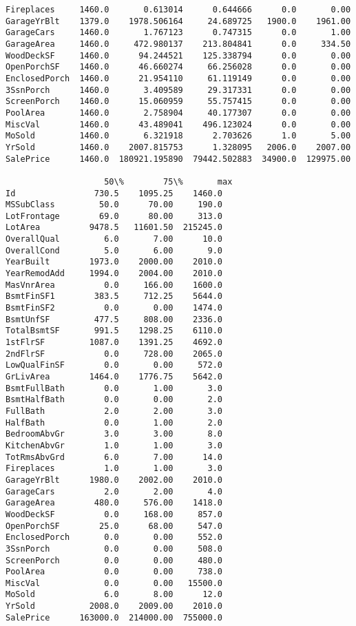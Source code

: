 \documentclass[12pt,a4paper,table]{article}
\begin{document}
\begin{tcolorbox}[breakable, size=fbox, boxrule=.5pt, pad at break*=1mm, opacityfill=0]
\begin{Verbatim}[commandchars=\\\{\}]
Fireplaces     1460.0       0.613014      0.644666      0.0       0.00
GarageYrBlt    1379.0    1978.506164     24.689725   1900.0    1961.00
GarageCars     1460.0       1.767123      0.747315      0.0       1.00
GarageArea     1460.0     472.980137    213.804841      0.0     334.50
WoodDeckSF     1460.0      94.244521    125.338794      0.0       0.00
OpenPorchSF    1460.0      46.660274     66.256028      0.0       0.00
EnclosedPorch  1460.0      21.954110     61.119149      0.0       0.00
3SsnPorch      1460.0       3.409589     29.317331      0.0       0.00
ScreenPorch    1460.0      15.060959     55.757415      0.0       0.00
PoolArea       1460.0       2.758904     40.177307      0.0       0.00
MiscVal        1460.0      43.489041    496.123024      0.0       0.00
MoSold         1460.0       6.321918      2.703626      1.0       5.00
YrSold         1460.0    2007.815753      1.328095   2006.0    2007.00
SalePrice      1460.0  180921.195890  79442.502883  34900.0  129975.00

                    50\%        75\%       max
Id                730.5    1095.25    1460.0
MSSubClass         50.0      70.00     190.0
LotFrontage        69.0      80.00     313.0
LotArea          9478.5   11601.50  215245.0
OverallQual         6.0       7.00      10.0
OverallCond         5.0       6.00       9.0
YearBuilt        1973.0    2000.00    2010.0
YearRemodAdd     1994.0    2004.00    2010.0
MasVnrArea          0.0     166.00    1600.0
BsmtFinSF1        383.5     712.25    5644.0
BsmtFinSF2          0.0       0.00    1474.0
BsmtUnfSF         477.5     808.00    2336.0
TotalBsmtSF       991.5    1298.25    6110.0
1stFlrSF         1087.0    1391.25    4692.0
2ndFlrSF            0.0     728.00    2065.0
LowQualFinSF        0.0       0.00     572.0
GrLivArea        1464.0    1776.75    5642.0
BsmtFullBath        0.0       1.00       3.0
BsmtHalfBath        0.0       0.00       2.0
FullBath            2.0       2.00       3.0
HalfBath            0.0       1.00       2.0
BedroomAbvGr        3.0       3.00       8.0
KitchenAbvGr        1.0       1.00       3.0
TotRmsAbvGrd        6.0       7.00      14.0
Fireplaces          1.0       1.00       3.0
GarageYrBlt      1980.0    2002.00    2010.0
GarageCars          2.0       2.00       4.0
GarageArea        480.0     576.00    1418.0
WoodDeckSF          0.0     168.00     857.0
OpenPorchSF        25.0      68.00     547.0
EnclosedPorch       0.0       0.00     552.0
3SsnPorch           0.0       0.00     508.0
ScreenPorch         0.0       0.00     480.0
PoolArea            0.0       0.00     738.0
MiscVal             0.0       0.00   15500.0
MoSold              6.0       8.00      12.0
YrSold           2008.0    2009.00    2010.0
SalePrice      163000.0  214000.00  755000.0
\end{Verbatim}
\end{tcolorbox}
        
\end{document}
